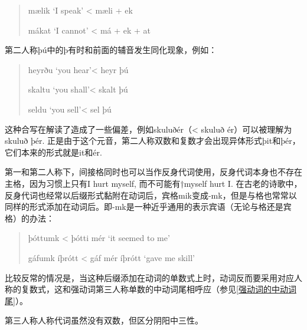\begin{quote}
mælik `I speak‌' \textless{} mæli + ek

mákat `I cannot‌' \textless{} má + ek + at
\end{quote}

第二人称þú中的þ有时和前面的辅音发生同化现象，例如：

\begin{quote}
heyrðu `you hear'\textless{} heyr þú

skaltu `you shall'\textless{} skalt þú

seldu `you sell'\textless{} sel þú
\end{quote}

这种合写在解读了造成了一些偏差，例如skuluðér（\textless{} skuluð
ér）可以被理解为skuluð þér.
正是由于这个元音，第二人称双数和复数才会出现异体形式þit和þér，它们本来的形式就是it和ér.

第一和第二人称下，间接格同时也可以当作反身代词使用，反身代词本身也不存在主格，因为习惯上只有I
hurt myself, 而不可能有†myself hurt I.
在古老的诗歌中，反身代词也经常以后缀形式黏附在动词后，宾格mik变成-mk，但是与格也常常以同样的形式添加在动词后。即-mk是一种近乎通用的表示宾语（无论与格还是宾格）的办法：

\begin{quote}
þóttumk \textless{} þótti mér `it seemed to me‌'

gáfumk íþrótt \textless{} gáf mér íþrótt `gave me skill'
\end{quote}

比较反常的情况是，当这种后缀添加在动词的单数式上时，动词反而要采用对应人称的复数式，这和强动词第三人称单数的中动词尾相呼应（参见\ref{强动词的中动词尾}）。

第三人称人称代词虽然没有双数，但区分阴阳中三性。


